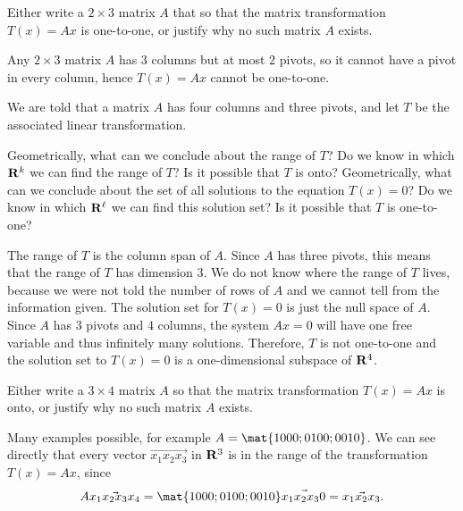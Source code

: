 \begin{problems}
\problem Either write a $2 \times 3$ matrix $A$ that so that the
matrix transformation $T(x)=Ax$ is one-to-one, or justify why no such
matrix $A$ exists.

\begin{solution}
  Any $2 \times 3$ matrix $A$ has $3$ columns but at most $2$ pivots,
  so it cannot have a pivot in every column, hence $T(x) = Ax$ cannot
  be one-to-one.
\end{solution}

\problem %
We are told that a matrix $A$ has four columns and three pivots, and let $T$ be the associated linear transformation.
\begin{subproblems}
  \subproblem Geometrically, what can we conclude about the range of
  $T$?  Do we know in which ${\bf R}^k$ we can find the range of $T$?
  Is it possible that $T$ is onto? %
  \subproblem Geometrically, what can we conclude about the set of all
  solutions to the equation $T(x) = 0$?  Do we know in which
  ${\bf R}^\ell$ we can find this solution set?  Is it possible that
  $T$ is one-to-one?
\end{subproblems}

\begin{solution}
  \begin{subproblems}
    \subproblem The range of $T$ is the column span of $A$.  Since $A$
    has three pivots, this means that the range of $T$ has dimension
    $3$.  We do not know where the range of $T$ lives, because we were
    not told the number of rows of $A$ and we cannot tell from the
    information given.
    \subproblem The solution set for $T(x) = 0$ is just the null space
    of $A$.  Since $A$ has $3$ pivots and $4$ columns, the system
    $Ax=0$ will have one free variable and thus infinitely many
    solutions.  Therefore, $T$ is not one-to-one and the solution set
    to $T(x)=0$ is a one-dimensional subspace of ${\bf R}^4$.
  \end{subproblems}
\end{solution}


\problem Either write a $3 \times 4$ matrix $A$ so that the matrix
transformation $T(x)=Ax$ is onto, or justify why no such matrix $A$
exists.

\begin{solution}
  Many examples possible, for example
  $A = \mat{1 0 0 0; 0 1 0 0; 0 0 1 0}$.  We can see directly that
  every vector $\vec{x_1 x_2 x_3}$ in ${\bf R}^3$ is in the range of
  the transformation $T(x)=Ax$, since
  \[A\vec{x_1 x_2 x_3 x_4} = \mat{1 0 0 0; 0 1 0 0; 0 0 1 0}
    \vec{x_1 x_2 x_3 0} = \vec{x_1 x_2 x_3}.\]
\end{solution}



\end{problems}
